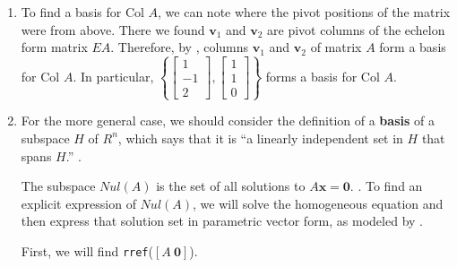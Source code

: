 \documentclass[10pt,letterpaper,final]{report}
\begin{document}
\begin{enumerate}[label=(\alph*)]
        The two boxed positions are the pivot positions, and columns $\mathbf{v}_1$ and $\mathbf{v}_2$ are pivot columns. Therefore, there are 2 pivot columns for $A$, and thence $\text{rank } A = \dim \text{Col } A = 2$.

  \item To find a basis for $\text{Col } A$, we can note where the pivot positions of the matrix were from above. There we found $\mathbf{v}_1$ and $\mathbf{v}_2$ are pivot columns of the echelon form matrix $EA$. Therefore, by \cite[Theorem 2.13, p. 159]{LayEtAl2020LinearAlgebraAndItsApplications}, columns $\mathbf{v}_1$ and $\mathbf{v}_2$ of matrix $A$ form a basis for $\text{Col } A$. In particular, $\left\{\begin{bmatrix} 1 \\ -1 \\ 2 \end{bmatrix}, \begin{bmatrix} 1 \\ 1 \\ 0 \end{bmatrix}\right\}$ forms a basis for $\text{Col } A$.
  \item For the more general case, we should consider the definition of a \textbf{basis} of a subspace $H$ of $R^n$, which says that it is ``a linearly independent set in $H$ that spans $H$.'' \cite[Definition of basis, p. 157]{LayEtAl2020LinearAlgebraAndItsApplications}.

        The subspace $Nul(A)$ is the set of all solutions to $A\mathbf{x} = \mathbf{0}$. \cite[Definition of null space, p. 157]{LayEtAl2020LinearAlgebraAndItsApplications}. To find an explicit expression of $Nul(A)$, we will solve the homogeneous equation and then express that solution set in parametric vector form, as modeled by \cite[Example 6, p. 158]{LayEtAl2020LinearAlgebraAndItsApplications}.

        First, we will find \texttt{rref}($\left[A \ \mathbf{0}\right]$).


\end{enumerate}
\end{document}

